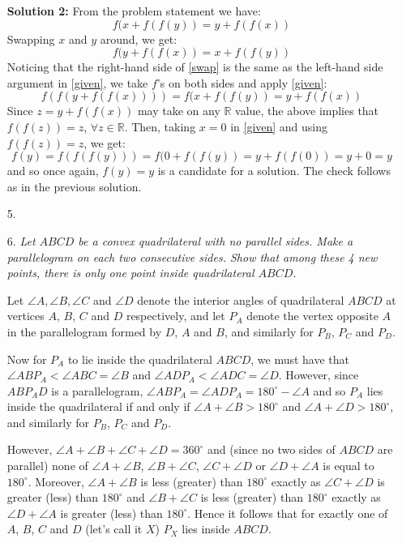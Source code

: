 \documentclass[a4paper,12pt]{article}
\begin{document}
\begin{enumerate}
  \textbf{Solution 2:}
  From the problem statement we have: 
  \begin{equation}\label{given}
    f(x+f(f(y)) = y+f(f(x))
  \end{equation} 
  Swapping $x$ and $y$ around, we get: 
  \begin{equation}\label{swap}
    f(y+f(f(x)) = x+f(f(y))
  \end{equation} 
  Noticing that the right-hand side of \eqref{swap} is the same as the left-hand side argument in \eqref{given}, we take $f$'s on both sides and apply \eqref{given}:
  \begin{equation*}
    f(f(y+f(f(x)))) = f(x+f(f(y)) = y+f(f(x))
  \end{equation*}
  Since $z = y+f(f(x))$ may take on any $\mathbb{R}$ value, the above implies that $f(f(z)) = z$, $\forall z\in \mathbb{R}$. Then, taking $x=0$ in \eqref{given} and using $f(f(z))=z$, we get:
  \begin{equation*}
    f(y) = f(f(f(y))) = f(0+f(f(y)) = y+f(f(0)) = y +0 = y
  \end{equation*} 
  and so once again, $f(y)=y$ is a candidate for a solution. The check follows as in the previous solution.
  

  \item[5.] 
  
  
  \item[6.] \emph{Let $ABCD$ be a convex quadrilateral with no parallel sides. Make a parallelogram on each two consecutive sides. Show that among these 4 new points, there is only one point inside quadrilateral $ABCD$.}
  
  Let $\angle A, \angle B, \angle C$ and $\angle D$ denote the interior angles of quadrilateral $ABCD$ at vertices $A$, $B$, $C$ and $D$ respectively, and let $P_A$ denote the vertex opposite $A$ in the parallelogram formed by $D$, $A$ and $B$, and similarly for $P_B$, $P_C$ and $P_D$.
  
  Now for $P_A$ to lie inside the quadrilateral $ABCD$, we must have that $\angle ABP_A < \angle ABC = \angle B$ and $\angle ADP_A < \angle ADC = \angle D$. However, since $ABP_AD$ is a parallelogram, $\angle ABP_A = \angle ADP_A = 180^\circ - \angle A$ and so $P_A$ lies inside the quadrilateral if and only if $\angle A + \angle B > 180^\circ$ and $\angle A + \angle D > 180^\circ$, and similarly for $P_B$, $P_C$ and $P_D$.
  
  However, $\angle A + \angle B + \angle C + \angle D = 360^\circ$ and (since no two sides of $ABCD$ are parallel) none of $\angle A + \angle B$, $\angle B + \angle C$, $\angle C + \angle D$ or $\angle D + \angle A$ is equal to $180^\circ$. Moreover, $\angle A + \angle B$ is less (greater) than $180^\circ$ exactly as $\angle C + \angle D$ is greater (less) than $180^\circ$ and $\angle B + \angle C$ is less (greater) than $180^\circ$ exactly as $\angle D + \angle A$ is greater (less) than $180^\circ$. Hence it follows that for exactly one of $A$, $B$, $C$ and $D$ (let's call it $X$) $P_X$ lies inside $ABCD$.
  
  
\end{enumerate}


\centering
\begin{BVerbatim}
\end{BVerbatim}
\end{document}
